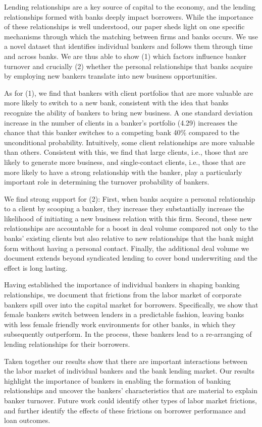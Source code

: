 Lending relationships are a key source of capital to the economy, and the lending relationships formed with banks deeply impact borrowers. While the importance of these relationships is well understood, our paper sheds light on one specific mechanisms through which the matching between firms and banks occurs. We use a novel dataset that identifies individual bankers and follows them through time and across banks. We are thus able to show (1) which factors influence banker turnover and crucially (2) whether the personal relationships that banks acquire by employing new bankers translate into new business opportunities.

As for (1), we find that bankers with client portfolios that are more valuable are more likely to switch to a new bank, consistent with the idea that banks recognize the ability of bankers to bring new business. A one standard deviation increase in the number of clients in a banker’s portfolio (4.29) increases the chance that this banker switches to a competing bank 40\% compared to the unconditional probability. Intuitively, some client relationships are more valuable than others. Consistent with this, we find that large clients, i.e., those that are likely to generate more business, and single-contact clients, i.e., those that are more likely to have a strong relationship with the banker, play a particularly important role in determining the turnover probability of bankers.

We find strong support for (2): First, when banks acquire a personal relationship to a client by scooping a banker, they increase they substantially increase the likelihood of initiating a new business relation with this firm. Second, these new relationships are accountable for a boost in deal volume compared not only to the banks' existing clients but also relative to new relationships that the bank might form without having a personal contact. Finally, the additional deal volume we document extends beyond syndicated lending to cover bond underwriting and the effect is long lasting.

Having established the importance of individual bankers in shaping banking relationships, we document that frictions from the labor market of corporate bankers spill over into the capital market for borrowers. Specifically, we show that female bankers switch between lenders in a predictable fashion, leaving banks with less female friendly work environments for other banks, in which they subsequently outperform. In the process, these bankers lead to a re-arranging of lending relationships for their borrowers.

Taken together our results show that there are important interactions between the labor market of individual bankers and the bank lending market. Our results highlight the importance of bankers in enabling the formation of banking relationships and uncover the bankers' characteristics that are material to explain banker turnover. Future work could identify other types of labor market frictions, and further identify the effects of these frictions on borrower performance and loan outcomes.